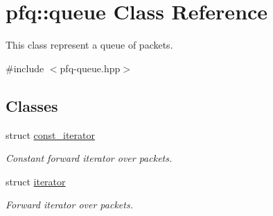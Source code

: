 \hypertarget{classpfq_1_1queue}{\section{pfq\+:\+:queue Class Reference}
\label{classpfq_1_1queue}
}


This class represent a queue of packets.  




{\ttfamily \#include $<$pfq-\/queue.\+hpp$>$}

\subsection*{Classes}
\begin{DoxyCompactItemize}
\item 
struct \hyperlink{structpfq_1_1queue_1_1const__iterator}{const\+\_\+iterator}
\begin{DoxyCompactList}\small\item\em Constant forward iterator over packets. \end{DoxyCompactList}\item 
struct \hyperlink{structpfq_1_1queue_1_1iterator}{iterator}
\begin{DoxyCompactList}\small\item\em Forward iterator over packets. \end{DoxyCompactList}\end{DoxyCompactItemize}
